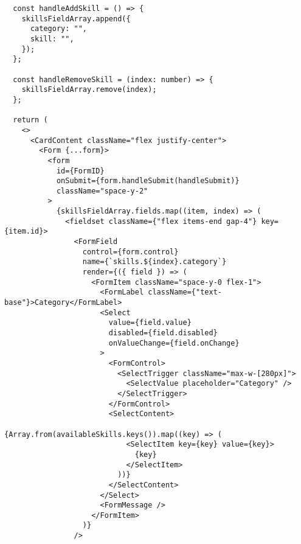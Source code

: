 \begin{verbatim}
  const handleAddSkill = () => {
    skillsFieldArray.append({
      category: "",
      skill: "",
    });
  };

  const handleRemoveSkill = (index: number) => {
    skillsFieldArray.remove(index);
  };

  return (
    <>
      <CardContent className="flex justify-center">
        <Form {...form}>
          <form
            id={FormID}
            onSubmit={form.handleSubmit(handleSubmit)}
            className="space-y-2"
          >
            {skillsFieldArray.fields.map((item, index) => (
              <fieldset className={"flex items-end gap-4"} key={item.id}>
                <FormField
                  control={form.control}
                  name={`skills.${index}.category`}
                  render={({ field }) => (
                    <FormItem className="space-y-0 flex-1">
                      <FormLabel className={"text-base"}>Category</FormLabel>
                      <Select
                        value={field.value}
                        disabled={field.disabled}
                        onValueChange={field.onChange}
                      >
                        <FormControl>
                          <SelectTrigger className="max-w-[280px]">
                            <SelectValue placeholder="Category" />
                          </SelectTrigger>
                        </FormControl>
                        <SelectContent>
                          {Array.from(availableSkills.keys()).map((key) => (
                            <SelectItem key={key} value={key}>
                              {key}
                            </SelectItem>
                          ))}
                        </SelectContent>
                      </Select>
                      <FormMessage />
                    </FormItem>
                  )}
                />


\end{verbatim}
